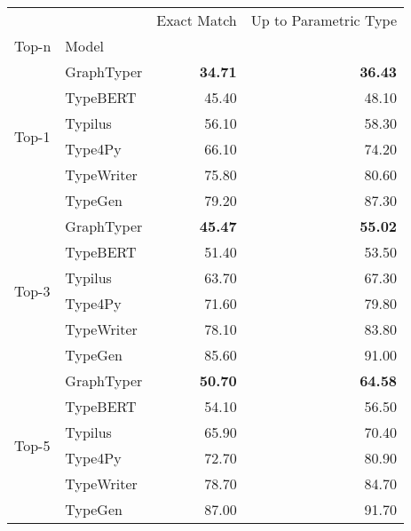 \begin{tabular}{llrr}
\toprule
 &  & Exact Match & Up to Parametric Type \\
Top-n & Model &  &  \\
\midrule
\multirow[c]{6}{*}{Top-1} & GraphTyper & \bfseries 34.71 & \bfseries 36.43 \\
 & TypeBERT & 45.40 & 48.10 \\
 & Typilus & 56.10 & 58.30 \\
 & Type4Py & 66.10 & 74.20 \\
 & TypeWriter & 75.80 & 80.60 \\
 & TypeGen & 79.20 & 87.30 \\
\cline{1-4}
\multirow[c]{6}{*}{Top-3} & GraphTyper & \bfseries 45.47 & \bfseries 55.02 \\
 & TypeBERT & 51.40 & 53.50 \\
 & Typilus & 63.70 & 67.30 \\
 & Type4Py & 71.60 & 79.80 \\
 & TypeWriter & 78.10 & 83.80 \\
 & TypeGen & 85.60 & 91.00 \\
\cline{1-4}
\multirow[c]{6}{*}{Top-5} & GraphTyper & \bfseries 50.70 & \bfseries 64.58 \\
 & TypeBERT & 54.10 & 56.50 \\
 & Typilus & 65.90 & 70.40 \\
 & Type4Py & 72.70 & 80.90 \\
 & TypeWriter & 78.70 & 84.70 \\
 & TypeGen & 87.00 & 91.70 \\
\cline{1-4}
\bottomrule
\end{tabular}

